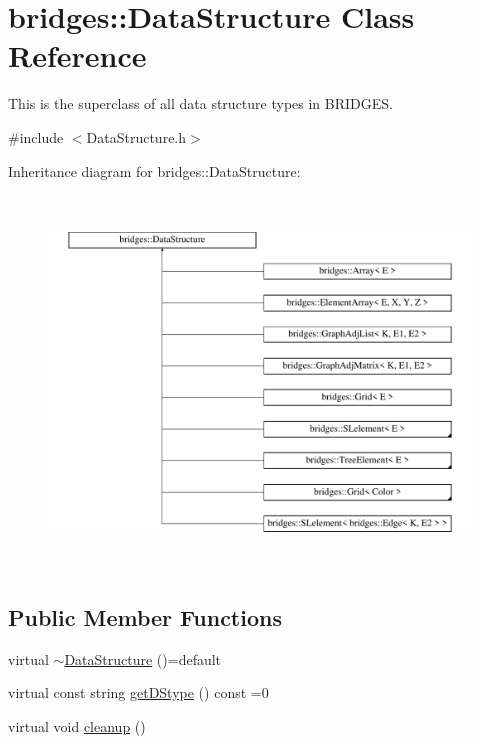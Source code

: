 \hypertarget{classbridges_1_1_data_structure}{}\section{bridges\+:\+:Data\+Structure Class Reference}
\label{classbridges_1_1_data_structure}


This is the superclass of all data structure types in B\+R\+I\+D\+G\+ES.  




{\ttfamily \#include $<$Data\+Structure.\+h$>$}

Inheritance diagram for bridges\+:\+:Data\+Structure\+:\begin{figure}[H]
\begin{center}
\leavevmode
\includegraphics[height=9.893993cm]{classbridges_1_1_data_structure}
\end{center}
\end{figure}
\subsection*{Public Member Functions}
\begin{DoxyCompactItemize}
\item 
virtual \mbox{\hyperlink{classbridges_1_1_data_structure_afd70a1ae5c2578d80a441714f95f9401}{$\sim$\+Data\+Structure}} ()=default
\item 
virtual const string \mbox{\hyperlink{classbridges_1_1_data_structure_a957a63b106e340bc753620c650632bdc}{get\+D\+Stype}} () const =0
\item 
virtual void \mbox{\hyperlink{classbridges_1_1_data_structure_ac3ad75810fd77f0ad35b9b5123d2c8f8}{cleanup}} ()
\end{DoxyCompactItemize}
